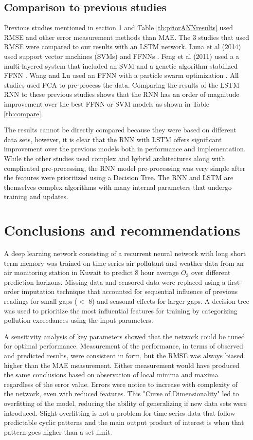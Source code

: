 \documentclass[preprint,12pt,authoryear]{elsarticle}
\begin{document}
\begin{linenumbers}
\subsection{Comparison to previous studies}
Previous studies mentioned in section 1 and Table \ref{tb:priorANNresults} used RMSE and other error measurement methods than MAE. The 3 studies that used RMSE were compared to our results with an LSTM network. Luna et al (2014) used support vector machines (SVMs) and FFNNs \citep{Luna2014}. Feng et al (2011) used a a multi-layered system that included an SVM and a genetic algorithm stabilized FFNN \citep{Feng2011}. Wang and Lu used an FFNN with a particle swarm optimization \citep{Wang2006}. All studies used PCA to pre-process the data. Comparing the results of the LSTM RNN to these previous studies shows that the RNN has an order of magnitude improvement over the best FFNN or SVM models as shown in Table \ref{tb:compare}.
%

%
The results cannot be directly compared because they were based on different data sets, however, it is clear that the RNN with LSTM offers significant improvement over the previous models both in performance and implementation. While the other studies used complex and hybrid architectures along with complicated pre-processing, the RNN model pre-processing was very simple after the features were prioritized using a Decision Tree. The RNN and LSTM are themselves complex algorithms with many internal parameters that undergo training and updates.
 
\section{Conclusions and recommendations}
A deep learning network consisting of a recurrent neural network with long short term memory was trained on time series air pollutant and weather data from an air monitoring station in Kuwait to predict 8 hour average $O_{3}$ over different prediction horizons. Missing data and censored data were replaced using a first-order imputation technique that accounted for sequential influence of previous readings for small gaps ($<$ 8) and seasonal effects for larger gaps. A decision tree was used to prioritize the most influential features for training by categorizing pollution exceedances using the input parameters.

A sensitivity analysis of key parameters showed that the network could be tuned for optimal performance. Measurement of the performance, in terms of observed and predicted results, were consistent in form, but the RMSE was always biased higher than the MAE measurement. Either measurement would have produced the same conclusions based on observation of local minima and maxima regardless of the error value. Errors were notice to increase with complexity of the network, even with reduced features. This "Curse of Dimensionality" led to overfitting of the model, reducing the ability of generalizing if new data sets were introduced. Slight overfitting is not a problem for time series data that follow predictable cyclic patterns and the main output product of interest is when that pattern goes higher than a set limit.


\end{linenumbers}
\end{document}
